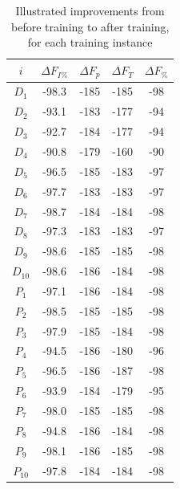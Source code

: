 \documentclass[12pt, titlepage]{report}
\theoremstyle{definition}
\begin{document}
\begin{table}
\begin{tabular}{cSSSS} \toprule
    {$i$}     & {$\Delta F_{I\%}$}	& {$\Delta F_p$} 	& {$\Delta F_T$} 	& {$\Delta F_{\%}$} \\ \midrule
    $D_1$  & -98.3 							& -185 					& -185    	 				& -98 \\
    $D_2$  & -93.1 							& -183 					& -177  					& 	-94 \\
    $D_3$  & -92.7							& -184 					& -177  					& 	-94 \\
    $D_4$  & -90.8 							& -179 					& -160 					& -90 \\
    $D_5$  & -96.5 							& -185 					& -183						& -97 \\
    $D_6$  & -97.7 							& -183 					& -183	  					& -97 \\
    $D_7$  & -98.7 							& -184 					& -184	  					& -98 \\
    $D_8$  & -97.3 							& -183 					& -183	  					& -97 \\
    $D_9$  & -98.6 							& -185 					& -185	  					& -98 \\
    $D_{10}$ & -98.6 						& -186 					& 	-184	  					& -98 \\ \midrule
    $P_1$  & -97.1  							& -186 					& -184		 				& -98 \\
    $P_2$  & -98.5  							& -185 					& -185	  					& -98 \\
    $P_3$  & -97.9 							& -185 					& -184	  					& -98 \\
    $P_4$  & -94.5  							& -186 					& -180  					& -96 \\
    $P_5$  & -96.5 							& -186 					& -187	   					& -98 \\
    $P_6$  & -93.9  							& -184 					& -179  					& -95 \\
    $P_7$  & -98.0  							& -185 					& -185	  					& -98 \\
    $P_8$  & -94.8  							& -186 					& -184	  					& -98 \\
    $P_9$  & -98.1  							& -186 					& -185	  					& -98 \\
    $P_{10}$ & -97.8  						& -184 					& -184						& -98 \\ \bottomrule
\end{tabular}

\caption{Illustrated improvements from before training to after training, for each training instance}
\end{table}
\end{document}
